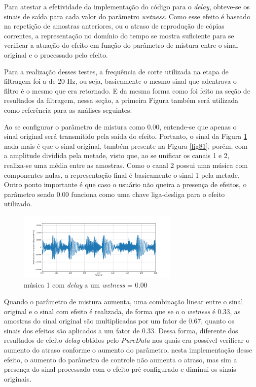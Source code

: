 Para atestar a efetividade da implementação do código para o \textit{delay}, obteve-se os sinais de saída para cada valor do parâmetro \textit{wetness}. Como esse efeito é baseado na repetição de amostras anteriores, ou o atraso de reprodução de cópias correntes, a representação no domínio do tempo se mostra suficiente para se verificar a atuação do efeito em função do parâmetro de mistura entre o sinal original e o processado pelo efeito. 

Para a realização desses testes, a frequência de corte utilizada na etapa de filtragem foi a de 20 Hz, ou seja, basicamente o mesmo sinal que adentrava o filtro é o mesmo que era retornado. E da mesma forma como foi feito na seção de resultados da filtragem, nessa seção, a primeira Figura também será utilizada como referência para as análises seguintes.

Ao se configurar o parâmetro de mistura como 0.00, entende-se que apenas o sinal original será transmitido pela saída do efeito. Portanto, o sinal da Figura \ref{fig89} nada mais é que o sinal original, também presente na Figura \ref{fig81}, porém, com a amplitude dividida pela metade, visto que, ao se unificar os canais 1 e 2, realiza-se uma média entre as amostras. Como o canal 2 possui uma música com componentes nulas, a representação final é basicamente o sinal 1 pela metade. Outro ponto importante é que caso o usuário não queira a presença de efeitos, o parâmetro sendo 0.00 funciona como uma chave liga-desliga para o efeito utilizado. 


\begin{figure}[h]
    \centering
    \includegraphics[width=0.7\textwidth]{figuras/fig89.png}
    \caption{música 1 com \textit{delay} a um \textit{wetness} = 0.00 }
    \label{fig89}
\end{figure}


Quando o parâmetro de mistura aumenta, uma combinação linear entre o sinal original e o sinal com efeito é realizada, de forma que se o o \textit{wetness} é 0.33, as amostras do sinal original são multiplicadas por um fator de 0.67, quanto os sinais dos efeitos são aplicados a um fator de 0.33. Dessa forma, diferente dos resultados de efeito \textit{delay} obtidos pelo \textit{PureData} nos quais era possível verificar o aumento do atraso conforme o aumento do parâmetro, nesta implementação desse efeito, o aumento do parâmetro de controle não aumenta o atraso, mas sim a presença do sinal processado com o efeito pré configurado e diminui os sinais originais. 

